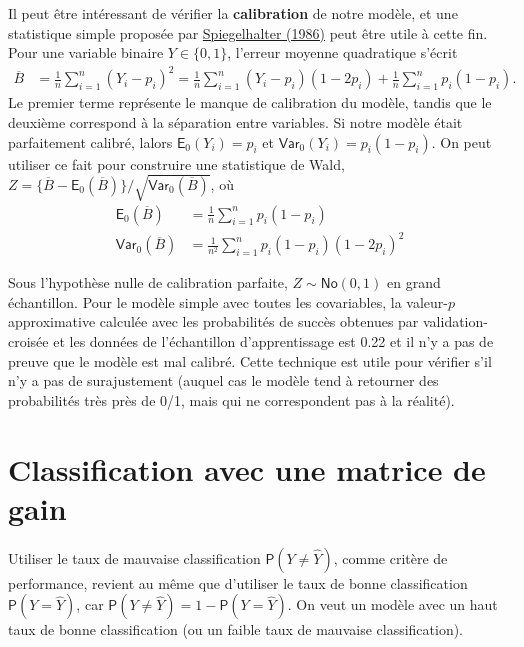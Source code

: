 \documentclass[
  11pt,
  letterpaper,
]{book}
\theoremstyle{definition}
\theoremstyle{definition}
\theoremstyle{definition}
\theoremstyle{remark}
\begin{document}
Il peut être intéressant de vérifier la \textbf{calibration} de notre modèle, et une statistique simple proposée par \href{https://doi.org/10.1002/sim.4780050506}{Spiegelhalter (1986)} peut être utile à cette fin. Pour une variable binaire \(Y \in \{0,1\}\), l'erreur moyenne quadratique s'écrit
\begin{align*}
\overline{B} &= \frac{1}{n} \sum_{i=1}^n (Y_i-p_i)^2 
=\frac{1}{n} \sum_{i=1}^n(Y_i-p_i)(1-2p_i) + \frac{1}{n} \sum_{i=1}^n p_i(1-p_i).
\end{align*}
Le premier terme représente le manque de calibration du modèle, tandis que le deuxième correspond à la séparation entre variables. Si notre modèle était parfaitement calibré, lalors \(\mathsf{E}_0(Y_i)=p_i\) et \(\mathsf{Var}_0(Y_i) = p_i(1-p_i)\). On peut utiliser ce fait pour construire une statistique de Wald, \(Z = \{\overline{B} - \mathsf{E}_0(\overline{B})\}/\sqrt{\mathsf{Var}_0(\overline{B})}\), où
\begin{align*}
\mathsf{E}_0(\overline{B})&= \frac{1}{n} \sum_{i=1}^n p_i(1-p_i) \\
\mathsf{Var}_0(\overline{B})&= \frac{1}{n^2} \sum_{i=1}^n p_i(1-p_i)(1-2p_i)^2
\end{align*}

Sous l'hypothèse nulle de calibration parfaite, \(Z \sim \mathsf{No}(0,1)\) en grand échantillon. Pour le modèle simple avec toutes les covariables, la valeur-\(p\) approximative calculée avec les probabilités de succès obtenues par validation-croisée et les données de l'échantillon d'apprentissage est 0.22 et il n'y a pas de preuve que le modèle est mal calibré. Cette technique est utile pour vérifier s'il n'y a pas de surajustement (auquel cas le modèle tend à retourner des probabilités très près de 0/1, mais qui ne correspondent pas à la réalité).

\hypertarget{classification-avec-une-matrice-de-gain}{%
\section{Classification avec une matrice de gain}\label{classification-avec-une-matrice-de-gain}}

Utiliser le taux de mauvaise classification \({\mathsf P}\left(Y \neq \widehat{Y}\right)\), comme critère de performance, revient au même que d'utiliser le taux de bonne classification \({\mathsf P}\left(Y=\widehat{Y}\right)\), car \({\mathsf P}\left(Y \neq \widehat{Y}\right) = 1-{\mathsf P}\left(Y=\widehat{Y}\right)\). On veut un modèle avec un haut taux de bonne classification (ou un faible taux de mauvaise classification).
\end{document}
